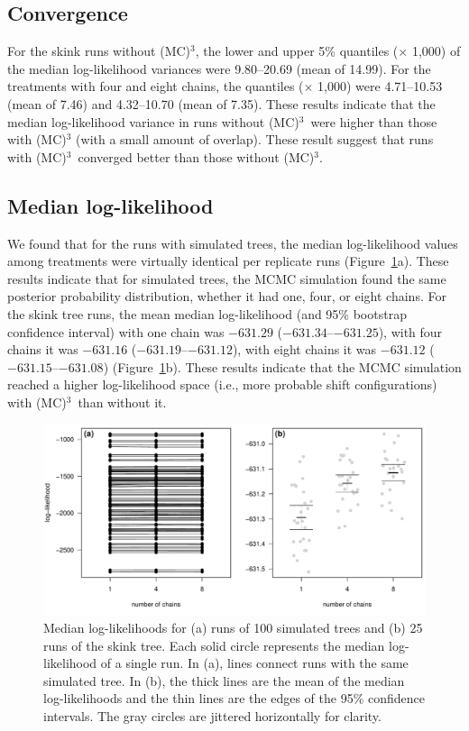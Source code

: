 \documentclass[12pt]{article}
\newcommand{\MCMCMC}{(MC)$^{3}$}
\begin{document}
\subsection*{Convergence}

For the skink runs without \MCMCMC,
the lower and upper 5\% quantiles ($\times$ 1,000)
of the median log-likelihood variances were 9.80--20.69 (mean of 14.99).
%
For the treatments with four and eight chains,
the quantiles ($\times$ 1,000) were 4.71--10.53 (mean of 7.46)
and 4.32--10.70 (mean of 7.35).
%
These results indicate that the median log-likelihood variance
in runs without \MCMCMC\ were higher than those with \MCMCMC
(with a small amount of overlap).
%
These result suggest that runs with \MCMCMC\ 
converged better than those without \MCMCMC.


\subsection*{Median log-likelihood}

We found that for the runs with simulated trees,
the median log-likelihood values among treatments
were virtually identical per replicate runs (Figure~\ref{fig:median-log-like}a).
%
These results indicate that for simulated trees,
the MCMC simulation found the same posterior probability distribution,
whether it had one, four, or eight chains.
%
For the skink tree runs,
the mean median log-likelihood (and 95\% bootstrap confidence interval)
with one chain was $-631.29$ ($-631.34$--$-631.25$),
with four chains it was $-631.16$ ($-631.19$--$-631.12$),
with eight chains it was $-631.12$ ($-631.15$--$-631.08$)
(Figure~\ref{fig:median-log-like}b).
%
These results indicate that the MCMC simulation
reached a higher log-likelihood space
(i.e., more probable shift configurations)
with \MCMCMC\ than without it.

\begin{figure}
\begin{center}
\includegraphics[width=14cm]{median-log-like.pdf}
\end{center}
\caption{Median log-likelihoods for (a) runs of 100 simulated trees
    and (b) 25 runs of the skink tree.
    Each solid circle represents the median log-likelihood of a single run.
    In (a), lines connect runs with the same simulated tree.
    In (b), the thick lines are the mean of the median log-likelihoods
    and the thin lines are the edges of the 95\% confidence intervals.
    The gray circles are jittered horizontally for clarity.}
\label{fig:median-log-like}
\end{figure}
\end{document}
